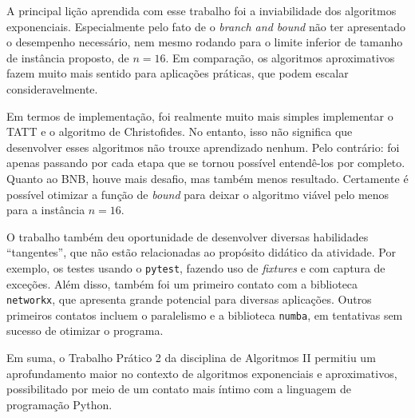 \documentclass{article}
\begin{document}
A principal lição aprendida com esse trabalho foi a inviabilidade dos algoritmos exponenciais. Especialmente pelo fato de o \textit{branch and bound} não ter apresentado o desempenho necessário, nem mesmo rodando para o limite inferior de tamanho de instância proposto, de \( n = 16 \). Em comparação, os algoritmos aproximativos fazem muito mais sentido para aplicações práticas, que podem escalar consideravelmente.

Em termos de implementação, foi realmente muito mais simples implementar o TATT e o algoritmo de Christofides. No entanto, isso não significa que desenvolver esses algoritmos não trouxe aprendizado nenhum. Pelo contrário: foi apenas passando por cada etapa que se tornou possível entendê-los por completo. Quanto ao BNB, houve mais desafio, mas também menos resultado. Certamente é possível otimizar a função de \textit{bound} para deixar o algoritmo viável pelo menos para a instância \( n = 16 \).

O trabalho também deu oportunidade de desenvolver diversas habilidades ``tangentes'', que não estão relacionadas ao propósito didático da atividade. Por exemplo, os testes usando o \texttt{pytest}, fazendo uso de \textit{fixtures} e com captura de exceções. Além disso, também foi um primeiro contato com a biblioteca \texttt{networkx}, que apresenta grande potencial para diversas aplicações. Outros primeiros contatos incluem o paralelismo e a biblioteca \texttt{numba}, em tentativas sem sucesso de otimizar o programa.

Em suma, o Trabalho Prático 2 da disciplina de Algoritmos II permitiu um aprofundamento maior no contexto de algoritmos exponenciais e aproximativos, possibilitado por meio de um contato mais íntimo com a linguagem de programação Python.

\end{document}
